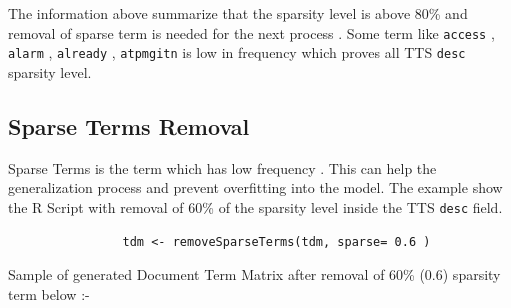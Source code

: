 \documentclass[]{article}
\begin{document}
\pagebreak

The information above summarize that the sparsity level is above 80\%
and removal of sparse term is needed for the next process . Some term
like \texttt{access} , \texttt{alarm} , \texttt{already} ,
\texttt{atpmgitn} is low in frequency which proves all TTS \texttt{desc}
sparsity level.

\subsection{Sparse Terms Removal}\label{sparse-terms-removal}

Sparse Terms is the term which has low frequency . This can help the
generalization process and prevent overfitting into the model. The
example show the R Script with removal of 60\% of the sparsity level
inside the TTS \texttt{desc} field.

\begin{verbatim}
                tdm <- removeSparseTerms(tdm, sparse= 0.6 )
\end{verbatim}

Sample of generated Document Term Matrix after removal of 60\% (0.6)
sparsity term below :-
\end{document}
